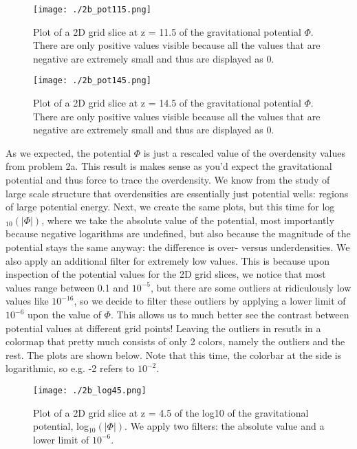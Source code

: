 \begin{figure}[h!]
  \centering
  \texttt{[image: ./2b\_pot115.png]}
  \caption{Plot of a 2D grid slice at z = 11.5 of the gravitational potential $\Phi$. There are only positive values visible because all the values that are negative are extremely small and thus are displayed as 0.}
\end{figure}

\begin{figure}[h!]
  \centering
  \texttt{[image: ./2b\_pot145.png]}
  \caption{Plot of a 2D grid slice at z = 14.5 of the gravitational potential $\Phi$. There are only positive values visible because all the values that are negative are extremely small and thus are displayed as 0.}
\end{figure}

As we expected, the potential $\Phi$ is just a rescaled value of the overdensity values from problem 2a. This result is makes sense as you'd expect the gravitational potential and thus force to trace the overdensity. We know from the study of large scale structure that overdensities are essentially just potential wells: regions of large potential energy. Next, we create the same plots, but this time for log$_{10}(|\Phi|)$, where we take the absolute value of the potential, most importantly because negative logarithms are undefined, but also because the magnitude of the potential stays the same anyway: the difference is over- versus underdensities. We also apply an additional filter for extremely low values. This is because upon inspection of the potential values for the 2D grid slices, we notice that most values range between 0.1 and $10^{-5}$, but there are some outliers at ridiculously low values like $10^{-16}$, so we decide to filter these outliers by applying a lower limit of $10^{-6}$ upon the value of $\Phi$. This allows us to much better see the contrast between potential values at different grid points! Leaving the outliers in resutls in a colormap that pretty much consists of only 2 colors, namely the outliers and the rest. The plots are shown below. Note that this time, the colorbar at the side is logarithmic, so e.g. -2 refers to $10^{-2}$. 

\begin{figure}[h!]
  \centering
  \texttt{[image: ./2b\_log45.png]}
  \caption{Plot of a 2D grid slice at z = 4.5 of the log10 of the gravitational potential, log$_10(|\Phi|)$. We apply two filters: the absolute value and a lower limit of $10^{-6}$.}
\end{figure}


